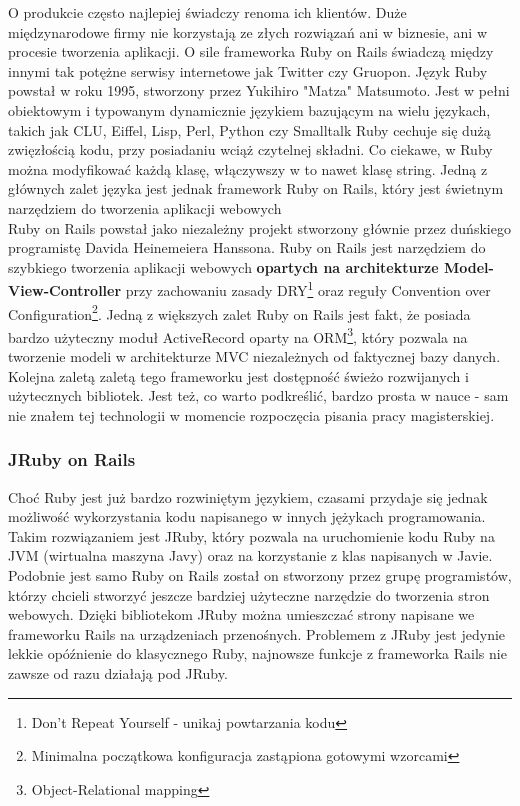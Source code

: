 \documentclass[12pt,leqno]{article}
\begin{document}
O produkcie często najlepiej świadczy renoma ich klientów. Duże międzynarodowe firmy nie korzystają ze złych rozwiązań ani w biznesie, ani w procesie tworzenia aplikacji. O sile frameworka Ruby on Rails świadczą między innymi tak potężne serwisy internetowe jak Twitter czy Gruopon. Język Ruby powstał w roku 1995, stworzony przez Yukihiro "Matza" Matsumoto. Jest w pełni obiektowym i typowanym dynamicznie językiem bazującym na wielu językach, takich jak CLU, Eiffel, Lisp, Perl, Python czy Smalltalk  Ruby cechuje się dużą zwięzłością kodu, przy posiadaniu wciąż czytelnej składni. Co ciekawe, w Ruby można modyfikować każdą klasę, włączywszy w to nawet klasę string.  Jedną z głównych zalet języka jest jednak framework Ruby on Rails, który jest świetnym narzędziem do tworzenia aplikacji webowych\\
Ruby on Rails powstał jako niezależny projekt stworzony głównie przez duńskiego programistę Davida Heinemeiera Hanssona. Ruby on Rails jest narzędziem do szybkiego tworzenia aplikacji webowych {\bf opartych na architekturze Model-View-Controller} przy zachowaniu zasady DRY\footnote {Don't Repeat Yourself - unikaj powtarzania kodu} oraz reguły Convention over Configuration\footnote {Minimalna początkowa konfiguracja zastąpiona gotowymi wzorcami}. Jedną z większych zalet Ruby on Rails jest fakt, że posiada bardzo użyteczny moduł ActiveRecord oparty na ORM\footnote {Object-Relational mapping}, który pozwala na tworzenie modeli w architekturze MVC niezależnych od faktycznej bazy danych. Kolejna zaletą zaletą tego frameworku jest dostępność świeżo rozwijanych i użytecznych bibliotek. Jest też, co warto podkreślić, bardzo prosta w nauce - sam nie znałem tej technologii w momencie rozpoczęcia pisania pracy magisterskiej. 

\subsubsection{JRuby on Rails}
Choć Ruby jest już bardzo rozwiniętym językiem, czasami przydaje się jednak możliwość wykorzystania kodu napisanego w innych jężykach programowania. Takim rozwiązaniem jest JRuby, który pozwala na uruchomienie kodu Ruby na JVM (wirtualna maszyna Javy) oraz na korzystanie z klas napisanych w Javie. Podobnie jest samo Ruby on Rails został on stworzony przez grupę programistów, którzy chcieli stworzyć jeszcze bardziej użyteczne narzędzie do tworzenia stron webowych. Dzięki bibliotekom JRuby można umieszczać strony napisane we frameworku Rails na urządzeniach przenośnych. Problemem z JRuby jest jedynie lekkie opóźnienie do klasycznego Ruby, najnowsze funkcje z frameworka Rails nie zawsze od razu działają pod JRuby.
\end{document}
